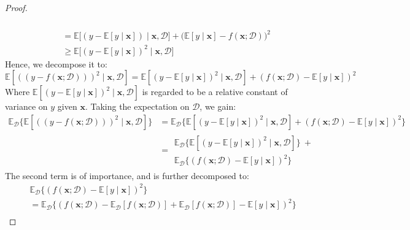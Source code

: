 \begin{proof}
\begin{equation}
\begin{split}
\begin{multlined}
            \end{multlined} \\
            & = \mathbb{E} \Big[(y-\mathbb{E}[y\mid \mathbf{x}])\mid \mathbf{x},\mathcal{D}\Big] + \big(\mathbb{E}[y\mid \mathbf{x}]-f(\mathbf{x};\mathcal{D})\big)^{2}\\
            & \geq \mathbb{E} \big[(y-\mathbb{E}[y\mid \mathbf{x}])^{2}\mid \mathbf{x},\mathcal{D}\big]
        \end{split}
    \end{equation}
    Hence, we decompose it to: 
    \begin{equation}
        \mathbb{E} \left[((y-f(\mathbf{x};\mathcal{D})))^{2}\mid \mathbf{x}, \mathcal{D}\right] = \mathbb{E}\left[(y-\mathbb{E}[y\mid \mathbf{x}])^{2}\mid \mathbf{x},\mathcal{D}\right] + (f(\mathbf{x};\mathcal{D})-\mathbb{E}[y\mid \mathbf{x}])^{2}
    \end{equation}
    Where $\mathbb{E}\left[(y-\mathbb{E}[y\mid \mathbf{x}])^{2}\mid \mathbf{x},\mathcal{D}\right]$ is regarded to be a relative constant of variance on $y$ given $\mathbf{x}$. Taking the expectation on $\mathcal{D}$, we gain: 
    \begin{equation}
        \begin{split}
            \mathbb{E}_{\mathcal{D}} \Big\{ \mathbb{E} \left[((y-f(\mathbf{x};\mathcal{D})))^{2}\mid \mathbf{x}, \mathcal{D}\right]\Big\} & = \mathbb{E}_{\mathcal{D}} \Big\{\mathbb{E}\left[(y-\mathbb{E}[y\mid \mathbf{x}])^{2}\mid \mathbf{x},\mathcal{D}\right] + (f(\mathbf{x};\mathcal{D})-\mathbb{E}[y\mid \mathbf{x}])^{2}\Big\}\\
            & = \begin{multlined}
                \mathbb{E}_{\mathcal{D}} \Big\{ \mathbb{E}\left[(y-\mathbb{E}[y\mid \mathbf{x}])^{2}\mid \mathbf{x},\mathcal{D}\right]\Big\} \: + \\ \mathbb{E}_{\mathcal{D}} \Big\{ (f(\mathbf{x};\mathcal{D})-\mathbb{E}[y\mid \mathbf{x}])^{2}\Big\}
            \end{multlined}
        \end{split}
    \end{equation}
    The second term is of importance, and is further decomposed to: 
    \begin{equation}
        \begin{split}
            & \mathbb{E}_{\mathcal{D}} \Big\{ (f(\mathbf{x};\mathcal{D})-\mathbb{E}[y\mid \mathbf{x}])^{2}\Big\} \\ 
            & = \mathbb{E}_{\mathcal{D}} \Big\{ (f(\mathbf{x};\mathcal{D})- \mathbb{E}_{\mathcal{D}}[f(\mathbf{x};\mathcal{D})] + \mathbb{E}_{\mathcal{D}}[f(\mathbf{x};\mathcal{D})] -\mathbb{E}[y\mid \mathbf{x}])^{2}\Big\} \\

\end{split}
\end{equation}
\end{proof}
